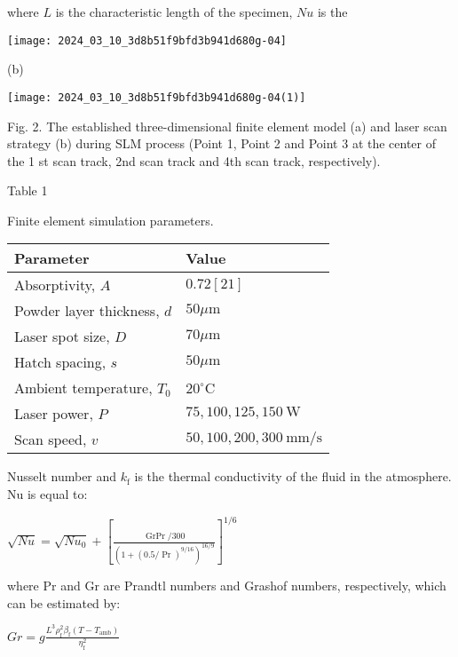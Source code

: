 \documentclass[10pt]{article}
\begin{document}
where $L$ is the characteristic length of the specimen, $N u$ is the

\begin{center}
\texttt{[image: 2024\_03\_10\_3d8b51f9bfd3b941d680g-04]}
\end{center}

(b)

\begin{center}
\texttt{[image: 2024\_03\_10\_3d8b51f9bfd3b941d680g-04(1)]}
\end{center}

Fig. 2. The established three-dimensional finite element model (a) and laser scan strategy (b) during SLM process (Point 1, Point 2 and Point 3 at the center of the 1 st scan track, 2nd scan track and 4th scan track, respectively).

Table 1

Finite element simulation parameters.

\begin{center}
\begin{tabular}{ll}
\hline
Parameter & Value \\
\hline
Absorptivity, $A$ & $0.72[21]$ \\
Powder layer thickness, $d$ & $50 \mu \mathrm{m}$ \\
Laser spot size, $D$ & $70 \mu \mathrm{m}$ \\
Hatch spacing, $s$ & $50 \mu \mathrm{m}$ \\
Ambient temperature, $T_{0}$ & $20^{\circ} \mathrm{C}$ \\
Laser power, $P$ & $75,100,125,150 \mathrm{~W}$ \\
Scan speed, $v$ & $50,100,200,300 \mathrm{~mm} / \mathrm{s}$ \\
\hline
\end{tabular}
\end{center}

Nusselt number and $k_{\mathrm{f}}$ is the thermal conductivity of the fluid in the atmosphere. $\mathrm{Nu}$ is equal to:

$\sqrt{N u}=\sqrt{N u_{0}}+\left[\frac{\operatorname{GrPr} / 300}{\left(1+(0.5 / \operatorname{Pr})^{9 / 16}\right)^{16 / 9}}\right]^{1 / 6}$

where $\mathrm{Pr}$ and $\mathrm{Gr}$ are Prandtl numbers and Grashof numbers, respectively, which can be estimated by:

$G r=g \frac{L^{3} \rho_{\mathrm{f}}^{2} \beta_{\mathrm{f}}\left(T-T_{\mathrm{amb}}\right)}{\eta_{\mathrm{f}}^{2}}$
\end{document}
